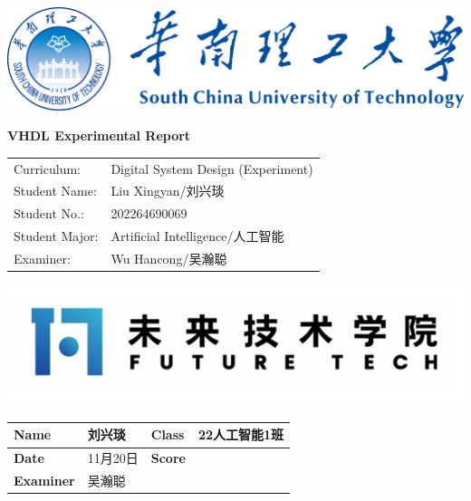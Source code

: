 \documentclass[12pt,a4paper,oneside]{ctexart}
\renewcommand{\arraystretch}{1.5}
\begin{document}
		\begin{titlepage}
			\begin{center}
				\par
				\includegraphics[width=1\linewidth]{SCUT1}
				\par
				\vskip 1cm
				\fontsize{30}{0}\textbf{VHDL Experimental Report}
				\vskip 3.5cm
				\large
				\begin{table}[!ht]
					\renewcommand{\arraystretch}{2}
					\fontsize{15}{0}
					\heiti
					\begin{tabular}{p{3cm} p{10cm}<{\centering}}
						Curriculum: & Digital System Design (Experiment) \\
						\cline{2-2}
						Student Name: & Liu Xingyan/\fontsize{13}{0}刘兴琰\\
						\cline{2-2}
						Student No.: & \large202264690069 \\
						\cline{2-2}
						Student Major: & Artificial Intelligence/\fontsize{13}{0}人工智能 \\
						\cline{2-2}
						Examiner: & Wu Hancong/\fontsize{13}{0}吴瀚聪\\
						\cline{2-2}
					\end{tabular}
				\end{table}
				\vskip 2cm
				\includegraphics[width=0.6\linewidth]{FT3.png} 
			\end{center}
		\end{titlepage}

\newpage

\begin{table}[!ht]
	\centering
	\begin{tabular}{|m{3.2cm}|m{3.2cm}|m{3.2cm}|m{3.2cm}|}
		\hline
		\textbf{Name} & 刘兴琰 & \textbf{Class} & 22人工智能1班 \\[0.2cm]
		\hline
		\textbf{Date} & 11月20日 & \textbf{Score} & \\[0.2cm]
		\hline
		\textbf{Examiner} & 吴瀚聪 & & \\[0.2cm]
		\hline
	\end{tabular}
\end{table}
\end{document}
